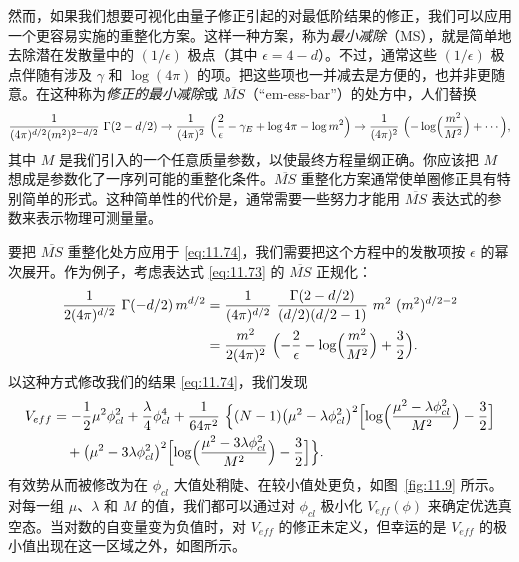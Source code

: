 然而，如果我们想要可视化由量子修正引起的对最低阶结果的修正，我们可以应用一个更容易实施的重整化方案。这样一种方案，称为\emph{最小减除}（MS），就是简单地去除潜在发散量中的 $(1/\epsilon)$ 极点（其中 $\epsilon = 4-d$）。不过，通常这些 $(1/\epsilon)$ 极点伴随有涉及 $\gamma$ 和 $\log(4\pi)$ 的项。把这些项也一并减去是方便的，也并非更随意。在这种称为\emph{修正的最小减除}或 $\overline{MS}$（``em-ess-bar''）的处方中，人们替换
\begin{equation}
  \frac{1}{(4\pi)^{d/2}(m^2)^{2-d/2}}\ \Gamma(2-d/2)
  \to \frac{1}{(4\pi)^2}\ \Bigl( \frac{2}{\epsilon} - \gamma_E
    + \log 4\pi - \log m^2 \Bigr)
  \to \frac{1}{(4\pi)^2}\ \Bigl( -\log\Bigl( \frac{m^2}{M^2} \Bigr)
    + \cdots \Bigr),
  \label{eq:11.77}
\end{equation}
其中 $M$ 是我们引入的一个任意质量参数，以使最终方程量纲正确。你应该把 $M$ 想成是参数化了一序列可能的重整化条件。$\overline{MS}$ 重整化方案通常使单圈修正具有特别简单的形式。这种简单性的代价是，通常需要一些努力才能用 $\overline{MS}$ 表达式的参数来表示物理可测量量。

要把 $\overline{MS}$ 重整化处方应用于 \eqref{eq:11.74}，我们需要把这个方程中的发散项按 $\epsilon$ 的幂次展开。作为例子，考虑表达式 \eqref{eq:11.73} 的 $\overline{MS}$ 正规化：
\begin{equation}
  \begin{aligned}
    \frac{1}{2(4\pi)^{d/2}}\ \Gamma(-d/2)\,m^{d/2}
    &= \frac{1}{(4\pi)^{d/2}}\ \frac{\Gamma(2-d/2)}{(d/2)(d/2-1)}\ m^2\
      (m^2)^{d/2-2}\\
    &= \frac{m^2}{2(4\pi)^2}\ \Bigl( -\frac{2}{\epsilon} - \log\Bigl(
      \frac{m^2}{M^2} \Bigr) + \frac{3}{2} \Bigr) .
  \end{aligned}
  \label{eq:11.78}
\end{equation}
以这种方式修改我们的结果 \eqref{eq:11.74}，我们发现
\begin{equation}
  \begin{aligned}
    V_{eff} &= -\frac{1}{2}\mu^2\phi_{cl}^2 + \frac{\lambda}{4}\phi_{cl}^4
      + \frac{1}{64\pi^2}\ \Bigl\{ (N-1)\bigl( \mu^2 - \lambda\phi_{cl}^2
        \bigr)^2\Bigl[ \log\Bigl( \frac{\mu^2 - \lambda\phi_{cl}^2}{M^2}
          \Bigr) - \frac{3}{2} \Bigr]\\
    &\quad + \bigl( \mu^2 - 3\lambda\phi_{cl}^2 \bigr)^2\Bigl[ \log\Bigl(
      \frac{\mu^2 - 3\lambda\phi_{cl}^2}{M^2} \Bigr) - \frac{3}{2}
      \Bigr] \Bigr\} .
  \end{aligned}
  \label{eq:11.79}
\end{equation}
有效势从而被修改为在 $\phi_{cl}$ 大值处稍陡、在较小值处更负，如图~\ref{fig:11.9} 所示。对每一组 $\mu$、$\lambda$ 和 $M$ 的值，我们都可以通过对 $\phi_{cl}$ 极小化 $V_{eff}(\phi)$ 来确定优选真空态。当对数的自变量变为负值时，对 $V_{eff}$ 的修正未定义，但幸运的是 $V_{eff}$ 的极小值出现在这一区域之外，如图所示。

